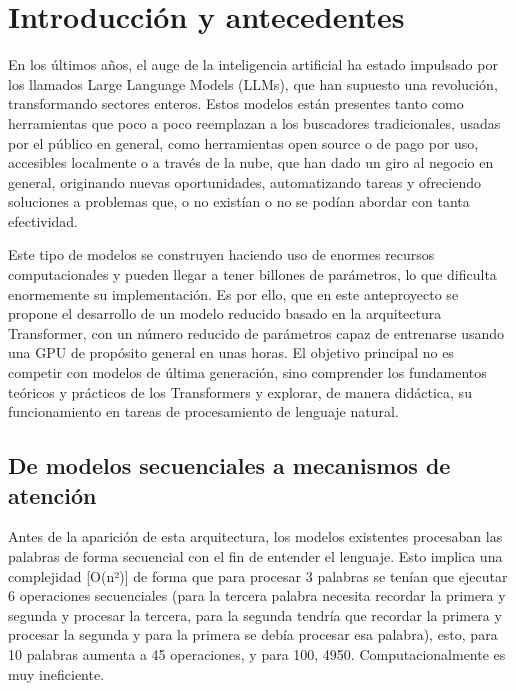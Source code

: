 \documentclass[11pt]{book}
\newcommand{\clearemptydoublepage}{\newpage{\pagestyle{empty}\cleardoublepage}}
\theoremstyle{plain}
\theoremstyle{definition}
\begin{document}
\tableofcontents

\clearemptydoublepage

\mainmatter                      %
\pagestyle{miestilo}    %

\chapter{Introducción y antecedentes}
En los últimos años, el auge de la inteligencia artificial ha estado impulsado por los llamados Large Language Models (LLMs), que han supuesto una revolución, transformando sectores enteros. Estos modelos están presentes tanto como herramientas que poco a poco reemplazan a los buscadores tradicionales, usadas por el público en general, como herramientas open source o de pago por uso, accesibles localmente o a través de la nube, que han dado un giro al negocio en general, originando nuevas oportunidades, automatizando tareas y ofreciendo soluciones a problemas que, o no existían o no se podían abordar con tanta efectividad.


Este tipo de modelos se construyen haciendo uso de enormes recursos computacionales y pueden llegar a tener billones de parámetros, lo que dificulta enormemente su implementación. Es por ello, que en este anteproyecto se propone el desarrollo de un modelo reducido basado en la arquitectura Transformer, con un número reducido de parámetros capaz de entrenarse usando una GPU de propósito
general en unas horas. El objetivo principal no es competir con modelos de última generación, sino comprender los fundamentos teóricos y prácticos de los Transformers y explorar, de manera didáctica, su funcionamiento en tareas de procesamiento de lenguaje natural.

\section{De modelos secuenciales a mecanismos de atención}
Antes de la aparición de esta arquitectura, los modelos existentes procesaban las palabras de forma secuencial con el fin de entender el lenguaje. Esto implica una complejidad [O(n²)] de forma que para procesar 3 palabras se tenían que ejecutar 6 operaciones secuenciales (para la tercera palabra necesita recordar la primera y segunda y procesar la tercera, para la segunda tendría que recordar la primera y procesar la segunda y para la primera se debía procesar esa palabra), esto, para 10 palabras aumenta a 45 operaciones, y para 100, 4950. Computacionalmente es muy ineficiente. 
\end{document}
